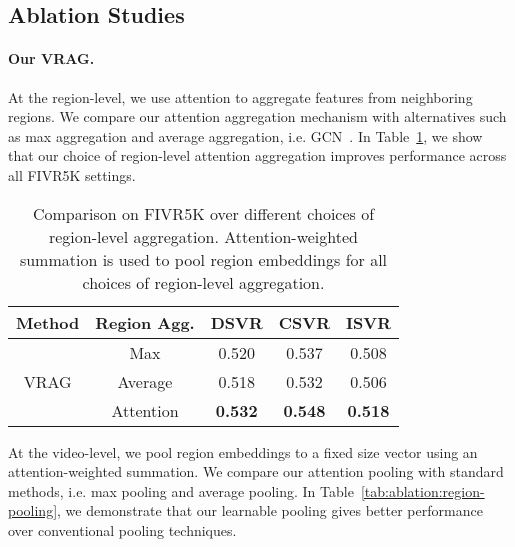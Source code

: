 \documentclass[letterpaper]{article} \usepackage{aaai22}  \usepackage{times}  \usepackage{helvet}  \usepackage{courier}  \usepackage[hyphens]{url}  \usepackage{graphicx} \urlstyle{rm} \usepackage{amsmath}
\begin{document}
\subsection{Ablation Studies}





\paragraph{Our VRAG.}
At the region-level, we use attention to aggregate features from neighboring regions. We compare our attention aggregation mechanism with alternatives such as max aggregation and average aggregation, i.e. GCN~\cite{gcn}. In Table~\ref{tab:ablation:region-aggregation}, we show that our choice of region-level attention aggregation improves performance across all FIVR5K settings.

\begin{table}[ht]
    \centering
    \begin{tabular}{|c|c|c|c|c|}
    \hline
         Method & Region Agg. & DSVR & CSVR & ISVR \\
         \hline\hline
\multirow{3}{*}{VRAG} & Max & 0.520 & 0.537 & 0.508 \\
         \cline{2-5}
         &  Average & 0.518 & 0.532 & 0.506 \\
         \cline{2-5}
          &  Attention & \textbf{0.532} & \textbf{0.548} & \textbf{0.518} \\
         \hline
    \end{tabular}
    \caption{Comparison on FIVR5K over different choices of region-level aggregation. Attention-weighted summation is used to pool region embeddings for all choices of region-level aggregation.}
    \label{tab:ablation:region-aggregation}
\end{table}

At the video-level, we pool region embeddings to a fixed size vector  using an attention-weighted summation. We compare our attention pooling with standard methods, i.e. max pooling and average pooling. In Table~\ref{tab:ablation:region-pooling}, we demonstrate that our learnable pooling gives better performance over conventional pooling techniques.  
\end{document}
